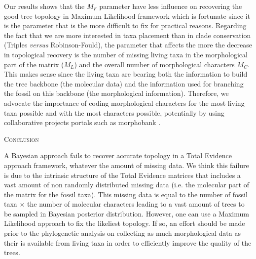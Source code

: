 \documentclass[12pt,letterpaper]{article}
\renewcommand{\section}[1]{%
\bigskip
\begin{center}
\begin{Large}
\normalfont\scshape #1
\medskip
\end{Large}
\end{center}}
\begin{document}
Our results shows that the $M_F$ parameter have less influence on recovering the good tree topology in Maximum Likelihood framework which is fortunate since it is the parameter that is the more difficult to fix for practical reasons.
Regarding the fact that we are more interested in taxa placement than in clade conservation (Triples \textit{versus} Robinson-Fould), the parameter that affects the more the decrease in topological recovery is the number of missing living taxa in the morphological part of the matrix ($M_L$) and the overall number of morphological characters $M_C$.
This makes sense since the living taxa are bearing both the information to build the tree backbone (the molecular data) and the information used for branching the fossil on this backbone (the morphological information).
Therefore, we advocate the importance of coding morphological characters for the most living taxa possible and with the most characters possible, potentially by using collaborative projects portals such as morphobank \citep{morphobank}.  







%
%


\section{Conclusion}
A Bayesian approach fails to recover accurate topology in a Total Evidence approach framework, whatever the amount of missing data.
We think this failure is due to the intrinsic structure of the Total Evidence matrices that includes a vast amount of non randomly distributed missing data (i.e. the molecular part of the matrix for the fossil taxa).
This missing data is equal to the number of fossil taxa $\times$ the number of molecular characters leading to a vast amount of trees to be sampled in Bayesian posterior distribution.
However, one can use a Maximum Likelihood approach to fix the likeliest topology.
If so, an effort should be made prior to the phylogenetic analysis on collecting as much morphological data as their is available from living taxa in order to efficiently improve the quality of the trees.

\end{document}

